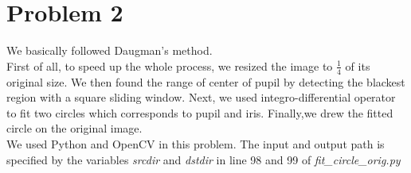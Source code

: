 \documentclass[12pt]{article}
\begin{document}
\section*{Problem 2}
We basically followed Daugman's method.\\
First of all, to speed up the whole process, we resized the image to $\frac{1}{4}$ of its original size.
We then found the range of center of pupil by detecting the blackest region with a square sliding window.
Next, we used integro-differential operator to fit two circles which corresponds to pupil and iris.
Finally,we drew the fitted circle on the original image.\\
We used Python and OpenCV in this problem.
The input and output path is specified by the variables \textit{srcdir} and \textit{dstdir} in line 98 and 99 of \textit{fit\_circle\_orig.py}
\end{document}
